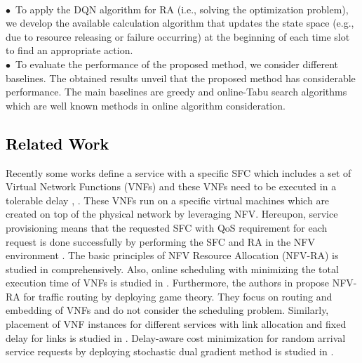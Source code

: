 \documentclass[20pt,twocolumn]{IEEEtran}
\begin{document}
\\$\bullet$~To apply the DQN algorithm for RA (i.e., solving the optimization problem), we develop the available calculation algorithm that updates the state space (e.g., due to resource releasing or failure occurring) at the beginning of each time slot to find an appropriate action. 
\\$\bullet$~To evaluate the performance of the proposed method, we consider different baselines.
The obtained results unveil  that the proposed method has considerable performance. The main baselines are greedy and online-Tabu search algorithms which  are well known methods in online algorithm consideration. 

\subsection{\textcolor{black}{Related Work}}
Recently some works define a service with a specific SFC which includes a set of Virtual Network Functions (VNFs)  and these VNFs need to be executed in a tolerable delay \cite{alleg2017delay}, \cite{ren2020efficient}. These VNFs run on a specific virtual machines which are created on  top of the physical network by leveraging NFV.  Hereupon,  service provisioning means that the requested SFC with QoS requirement for each request is done successfully by performing the SFC  and RA in the NFV environment \cite{kamgang2020slice}.
The basic principles of NFV Resource Allocation (NFV-RA) is studied in \cite{herrera2016resource} comprehensively. Also, online scheduling with minimizing the total execution time of VNFs is studied in \cite{mijumbi2015design}. Furthermore,
the authors in \cite{hamann2019path} propose NFV-RA for traffic routing by deploying game theory. They focus on routing and embedding of VNFs and do not consider the scheduling problem. Similarly, placement of VNF instances for different services with link allocation and fixed delay for links is studied in \cite{nguyen2019practical}. Delay-aware cost minimization for random arrival service requests by deploying stochastic dual
gradient method is studied in \cite{chen2018multi}.
\end{document}
